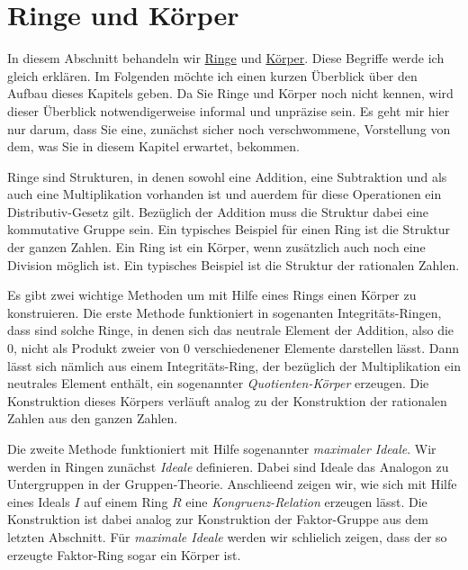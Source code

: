 \chapter{Ringe und K\"{o}rper}
In diesem Abschnitt behandeln wir 
\href{http://de.wikipedia.org/wiki/Ring_(Algebra)}{Ringe} und 
\href{http://en.wikipedia.org/wiki/Field_(mathematics)}{K\"{o}rper}.  Diese Begriffe werde ich gleich erkl\"{a}ren.
Im Folgenden m\"{o}chte ich einen kurzen \"{U}berblick \"{u}ber den Aufbau dieses Kapitels geben.  Da Sie Ringe und
K\"{o}rper  noch nicht kennen, wird dieser \"{U}berblick notwendigerweise informal und
unpr\"{a}zise sein.  Es geht mir hier nur darum, dass Sie eine, zun\"{a}chst sicher noch verschwommene, Vorstellung
von dem, was Sie in diesem Kapitel erwartet, bekommen.

Ringe sind Strukturen, in denen
sowohl eine Addition, eine Subtraktion und als auch eine Multiplikation vorhanden ist und au\3erdem f\"{u}r diese
Operationen ein Distributiv-Gesetz gilt.  Bez\"{u}glich der Addition muss die Struktur dabei eine kommutative
Gruppe sein. Ein typisches Beispiel f\"{u}r einen Ring ist die Struktur der ganzen
Zahlen. Ein Ring ist ein K\"{o}rper, wenn zus\"{a}tzlich auch noch eine Division m\"{o}glich ist.
Ein typisches Beispiel ist die Struktur der rationalen Zahlen.

Es gibt zwei wichtige Methoden um mit Hilfe eines Rings einen K\"{o}rper zu konstruieren.
Die erste Methode funktioniert in sogenanten Integrit\"{a}ts-Ringen, dass sind solche Ringe, in denen sich 
das neutrale Element der Addition, also die $0$, nicht als Produkt zweier von $0$ verschiedenener Elemente 
darstellen l\"{a}sst.  Dann l\"{a}sst sich n\"{a}mlich aus einem Integrit\"{a}ts-Ring, der bez\"{u}glich der
Multiplikation ein 
neutrales Element enth\"{a}lt, ein sogenannter \emph{\color{blue}Quotienten-K\"{o}rper} erzeugen.
Die Konstruktion dieses K\"{o}rpers 
verl\"{a}uft analog zu der Konstruktion der rationalen Zahlen aus den ganzen Zahlen.

Die zweite Methode funktioniert mit Hilfe sogenannter \emph{\color{blue}maximaler Ideale}.  Wir
werden in Ringen zun\"{a}chst  
\emph{\color{blue}Ideale} definieren.  Dabei sind Ideale das Analogon zu Untergruppen in der Gruppen-Theorie.
Anschlie\3end zeigen wir, wie sich mit Hilfe eines Ideals $I$ auf einem Ring $R$ eine \emph{\color{blue}Kongruenz-Relation}
erzeugen l\"{a}sst.  Die Konstruktion ist dabei analog zur Konstruktion der
Faktor-Gruppe aus dem letzten Abschnitt.  F\"{u}r \emph{\color{blue}maximale Ideale} werden wir schlie\3lich zeigen,
dass der so erzeugte Faktor-Ring sogar ein K\"{o}rper ist.

